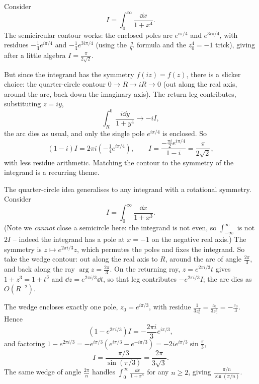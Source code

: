 \documentclass[a4paper]{scrartcl}
\begin{document}
\begin{example}
	Consider
	$$
	I = \int_0^\infty \frac{\dd x}{1 + x^4}.
	$$
	The semicircular contour works: the enclosed poles are $e^{i\pi/4}$ and $e^{3i\pi/4}$, with residues $-\frac{1}{4}e^{i\pi/4}$ and $-\frac{1}{4}e^{3i\pi/4}$ (using the $\frac{g}{h'}$ formula and the $z_0^4 = -1$ trick), giving after a little algebra $I = \frac{\pi}{2\sqrt 2}$.

	But since the integrand has the symmetry $f(iz) = f(z)$, there is a slicker choice: the quarter-circle contour $0 \to R \to iR \to 0$ (out along the real axis, around the arc, back down the imaginary axis). The return leg contributes, substituting $z = iy$,
	$$
	\int_R^0 \frac{i \dd y}{1 + y^4} \to -iI,
	$$
	the arc dies as usual, and only the single pole $e^{i\pi/4}$ is enclosed. So
	$$
	(1 - i) I = 2\pi i \left(-\tfrac 14 e^{i\pi/4}\right), \qquad I = \frac{-\frac{\pi i}{2} e^{i \pi /4}}{1 - i} = \frac{\pi}{2\sqrt{2}},
	$$
	with less residue arithmetic. Matching the contour to the symmetry of the integrand is a recurring theme.
\end{example}

\begin{example}
	The quarter-circle idea generalises to any integrand with a rotational symmetry. Consider
	$$
	I = \int_0^\infty \frac{\dd x}{1 + x^3}.
	$$
	(Note we \emph{cannot} close a semicircle here: the integrand is not even, so $\int_{-\infty}^\infty$ is not $2I$ -- indeed the integrand has a pole at $x = -1$ on the negative real axis.) The symmetry is $z \mapsto e^{2\pi i/3} z$, which permutes the poles and fixes the integrand. So take the wedge contour: out along the real axis to $R$, around the arc of angle $\frac{2\pi}{3}$, and back along the ray $\arg z = \frac{2\pi}{3}$. On the returning ray, $z = e^{2\pi i /3} t$ gives $1 + z^3 = 1 + t^3$ and $\dd z = e^{2\pi i/3} \dd t$, so that leg contributes $-e^{2\pi i /3} I$; the arc dies as $O(R^{-2})$.

	The wedge encloses exactly one pole, $z_0 = e^{i\pi/3}$, with residue $\frac{1}{3z_0^2} = \frac{z_0}{3 z_0^3} = -\frac{z_0}{3}$. Hence
	$$
	(1 - e^{2\pi i /3}) I = -\frac{2\pi i}{3} e^{i\pi/3},
	$$
	and factoring $1 - e^{2\pi i/3} = -e^{i\pi/3}(e^{i\pi/3} - e^{-i\pi/3}) = -2i e^{i\pi/3}\sin\frac\pi 3$,
	$$
	I = \frac{\pi/3}{\sin(\pi/3)} = \frac{2\pi}{3\sqrt 3}.
	$$
	The same wedge of angle $\frac{2\pi}{n}$ handles $\int_0^\infty \frac{\dd x}{1 + x^n}$ for any $n \geq 2$, giving $\frac{\pi/n}{\sin(\pi/n)}$.
\end{example}
\end{document}
